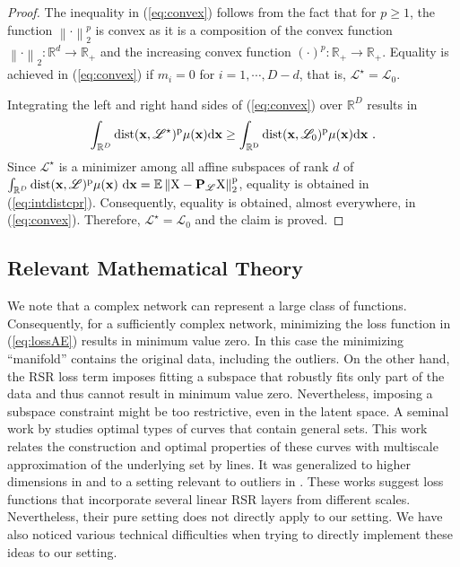 \documentclass{article} \usepackage{iclr2020_conference,times}
\def\eqref#1{(\ref{#1})}
\def\LL{{\mathscr{L}}}
\def\rvx{{\mathbf{x}}}
\def\rmP{{\mathbf{P}}}
\newcommand{\E}{\mathbb{E}}
\newcommand{\R}{\mathbb{R}}
\newcommand{\norm}[1]{\left\lVert#1\right\rVert}
\begin{document}
\begin{proof}
The inequality in \eqref{eq:convex} follows from the fact that for  $p \geq 1$, the function $\norm{\cdot}_2^p$ is convex as it is a composition of the convex function $\norm{\cdot}_2: \R^d \rightarrow \R_{+}$ and the increasing convex function $(\cdot)^p: \R_{+} \rightarrow \R_{+}$. Equality is achieved in \eqref{eq:convex} if $m_i = 0$ for $i=1, \cdots, D-d$, that is, $\LL^{\star} = \LL_0$. 


Integrating the left and right hand sides of \eqref{eq:convex} over $\R^D$ results in 
\begin{equation}\label{eq:intdistcpr}
    \int_{\R^D} \rm{dist}(\rvx, \LL^{\star})^p \mu(\rvx) d\rvx \geq \int_{\R^D} \rm{dist}(\rvx, \LL_0)^p \mu(\rvx) d\rvx ~.
\end{equation}
Since $\LL^{\star}$ is a minimizer among all affine subspaces of rank $d$ of  
$\int_{\R^D} \rm{dist}(\rvx,\LL)^p \mu(\rvx) ~ \rm{d}\rvx = \E \norm{X - \rmP_\LL X}_2^p$, equality is obtained in \eqref{eq:intdistcpr}. Consequently, equality is obtained, almost everywhere, in \eqref{eq:convex}. Therefore, $\LL^{\star} = \LL_0$ and the claim is proved.
\end{proof}


\subsection{Relevant Mathematical Theory}
\label{subsec:betas}
We note that a complex network can represent a large class of functions. 
Consequently, for a sufficiently complex network, minimizing the loss function in \eqref{eq:lossAE} results in minimum value zero. In this case the minimizing ``manifold'' contains the original data, including the outliers. On the other hand, the RSR loss term imposes fitting a subspace that robustly fits only part of the data and thus cannot result in minimum value zero. Nevertheless, imposing a subspace constraint might be too restrictive, even in the latent space.  A seminal work by \citet{Jones90} studies optimal types of curves that contain general sets. This work relates the construction and optimal properties of these curves with multiscale approximation of the underlying set by lines. It was generalized to higher dimensions in \citep{DS93} and to a setting relevant to outliers in \citep{Lerman03}. These works suggest loss functions that incorporate several linear RSR layers from different scales.
Nevertheless, their pure setting does not directly apply to our setting. We have also noticed various technical difficulties when trying to directly implement these ideas to our setting.
\end{document}

